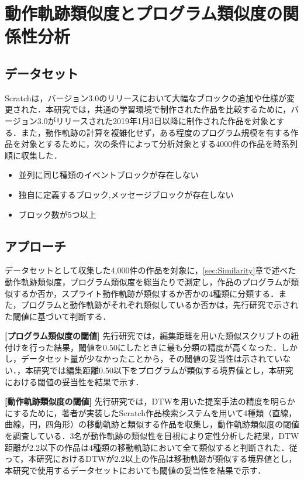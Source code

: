 \documentclass[T,J]{fose} %
\begin{document}
\section{動作軌跡類似度とプログラム類似度の関係性分析}\label{sec:Analysis}

\subsection{データセット}
Scratchは，バージョン3.0のリリースにおいて大幅なブロックの追加や仕様が変更された．本研究では，共通の学習環境で制作された作品を比較するために，バージョン3.0がリリースされた2019年1月3日以降に制作された作品を対象とする．また，動作軌跡の計算を複雑化せず，ある程度のプログラム規模を有する作品を対象とするために，次の条件によって分析対象とする4000件の作品を時系列順に収集した．
\begin{itemize}
    \item 並列に同じ種類のイベントブロックが存在しない
    \item 独自に定義するブロック,メッセージブロックが存在しない
    \item ブロック数が5つ以上
\end{itemize}

\subsection{アプローチ}\label{subsec:approach}

データセットとして収集した4,000件の作品を対象に，\ref{sec:Similarity}章で述べた動作軌跡類似度，プログラム類似度を総当たりで測定し，作品のプログラムが類似するか否か，スプライト動作軌跡が類似するか否かの4種類に分類する．また，プログラムと動作軌跡がそれぞれ類似しているか否かは，先行研究で示された閾値に基づいて判断する．

\noindent\textbf{[プログラム類似度の閾値] }先行研究\cite{Mikura2022}では，編集距離を用いた類似スクリプトの紐付けを行った結果，閾値を0.50にしたときに最も分類の精度が高くなった．しかし，データセット量が少なかったことから，その閾値の妥当性は示されていない．，本研究では編集距離0.50以下をプログラムが類似する境界値とし，本研究における閾値の妥当性を結果で示す．

\noindent\textbf{[動作軌跡類似度の閾値] }先行研究\cite{Fukuchi2021}では，DTWを用いた提案手法の精度を明らかにするために，著者が実装したScratch作品検索システムを用いて4種類（直線，曲線，円，四角形）の移動軌跡と類似する作品を収集し，動作軌跡類似度の閾値を調査している．3名が動作軌跡の類似性を目視により定性分析した結果，DTW距離が2.2以下の作品は4種類の移動軌跡において全て類似すると判断された．従って，本研究におけるDTWが2.2以上の作品は移動軌跡が類似する境界値とし，本研究で使用するデータセットにおいても閾値の妥当性を結果で示す．
\end{document}
